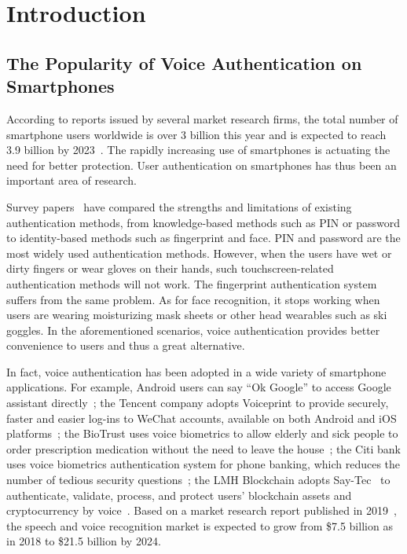 \section{Introduction}

\subsection{The Popularity of Voice Authentication on Smartphones}

According to reports issued by several market research firms, the total number of smartphone users worldwide is over 3 billion this year and is expected to reach 3.9 billion by 2023~\cite{report2018newzoo,report2019forrester}. The rapidly increasing use of smartphones is actuating the need for better protection. User authentication on smartphones has thus been an important area of research. 

Survey papers~\cite{vongsingthong2014survey,mahfouz2017survey,shankar2018survey} have compared the strengths and limitations of existing authentication methods, from knowledge-based methods such as PIN or password to identity-based methods such as fingerprint and face.
%
PIN and password are the most widely used authentication methods. However, when the users have wet or dirty fingers or wear gloves on their hands, such touchscreen-related authentication methods will not work. The fingerprint authentication system suffers from the same problem. As for face recognition, it stops working when users are wearing moisturizing mask sheets or other head wearables such as ski goggles. In the aforementioned scenarios, voice authentication provides better convenience to users and thus a great alternative.


In fact, voice authentication has been adopted in a wide variety of smartphone applications. 
For example, Android users can say ``Ok Google'' to access Google assistant directly~\cite{onlinegoogle}; the Tencent company adopts Voiceprint to provide securely, faster and easier log-ins to WeChat accounts, available on both Android and iOS platforms~\cite{onlinewechat}; the BioTrust uses voice biometrics to allow elderly and sick people to order prescription medication without the need to leave the house~\cite{onlinebio}; the Citi bank uses voice biometrics authentication system for phone banking, which reduces the number of tedious security questions~\cite{onlineciti}; the LMH Blockchain adopts Say-Tec~\cite{onlinesaytec} to authenticate, validate, process, and protect users' blockchain assets and cryptocurrency by voice~\cite{onlineblockchain}.
%
Based on a market research report published in 2019~\cite{onlinemarket}, the speech and voice recognition market is expected to grow from 
 \$7.5 billion as in 2018 to  \$21.5 billion by 2024. 
 

